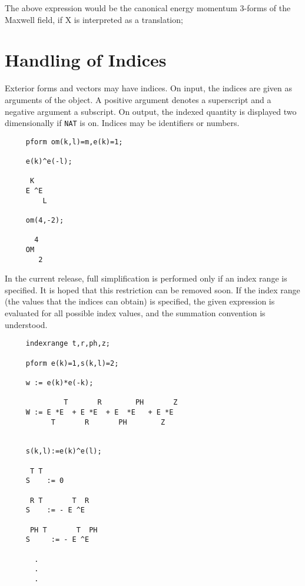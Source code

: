 The above expression would be the canonical energy
momentum 3-forms of the Maxwell field, if X is interpreted
as a translation;



\section{Handling of Indices}
Exterior forms and vectors may have indices.  On input, the indices
are given as arguments of the object.  A positive argument denotes a
superscript and a negative argument a subscript.  On output, the
indexed quantity is displayed two dimensionally if {\tt NAT} is on.
Indices may be identifiers or numbers.

\example{}

\begin{verbatim}
     pform om(k,l)=m,e(k)=1;

     e(k)^e(-l);

      K
     E ^E
         L

     om(4,-2);

       4
     OM
        2
\end{verbatim}

In the current release, full simplification is performed only if an
index range is specified.  It is hoped that this restriction can be
removed soon.  If the index range (the values that the indices can
obtain) is specified, the given expression is evaluated for all
possible index values, and the summation convention is understood.

\example\label{INDEXRANGE}

\begin{verbatim}
     indexrange t,r,ph,z;

     pform e(k)=1,s(k,l)=2;

     w := e(k)*e(-k);

              T       R        PH       Z
     W := E *E  + E *E  + E  *E   + E *E
           T       R       PH        Z


     s(k,l):=e(k)^e(l);

      T T
     S    := 0

      R T       T  R
     S    := - E ^E

      PH T       T  PH
     S     := - E ^E

       .
       .
       .

\end{verbatim}

